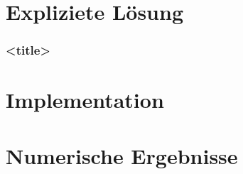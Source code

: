 \documentclass{beamer}
\begin{document}
\section{Expliziete Lösung}

\begin{frame}
    \frametitle{<title>}

    

\end{frame}

%    




\section{Implementation}

%    



\section{Numerische Ergebnisse}
\end{document}
